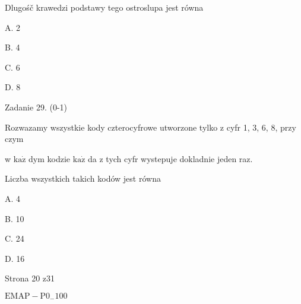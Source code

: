 \documentclass[a4paper,12pt]{article}
\begin{document}
Dlugośč krawedzi podstawy tego ostroslupa jest równa

A. 2

B. 4

C. 6

D. 8

Zadanie 29. (0-1)

Rozwazamy wszystkie kody czterocyfrowe utworzone tylko z cyfr 1, 3, 6, 8, przy czym

w $\mathrm{k}\mathrm{a}\dot{\mathrm{z}}$ dym kodzie $\mathrm{k}\mathrm{a}\dot{\mathrm{z}}$ da z tych cyfr wystepuje dokladnie jeden raz.

Liczba wszystkich takich kodów jest równa

A. 4

B. 10

C. 24

D. 16

Strona 20 z31

$\mathrm{E}\mathrm{M}\mathrm{A}\mathrm{P}-\mathrm{P}0_{-}100$
\end{document}
